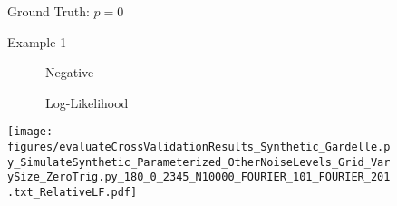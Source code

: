 \begin{figure}
\center

Ground Truth: $p = 0$


\begin{comment}
python3 CounterfactualModel_VIZ.py 0 0 10.0 180 FOURIER_101 FOURIER_201 2345
python3 CounterfactualModel_VIZ.py 0 0 10.0 180 FOURIER_102 FOURIER_202 2345
python3 CounterfactualModel_VIZ.py 0 0 10.0 180 FOURIER_103 FOURIER_203 2345


python3 RunSynthetic_FreePrior_ZeroTrig_OnSim_VIZ.py 0 0 10.0 180 SimulateSynthetic_Parameterized_OtherNoiseLevels_Grid_VarySize_ZeroTrig.py_180_0_2345_N10000_FOURIER_101_FOURIER_201.txt
python3 RunSynthetic_FreePrior_ZeroTrig_OnSim_VIZ.py 0 0 10.0 180 SimulateSynthetic_Parameterized_OtherNoiseLevels_Grid_VarySize_ZeroTrig.py_180_0_2345_N10000_FOURIER_102_FOURIER_202.txt
python3 RunSynthetic_FreePrior_ZeroTrig_OnSim_VIZ.py 0 0 10.0 180 SimulateSynthetic_Parameterized_OtherNoiseLevels_Grid_VarySize_ZeroTrig.py_180_0_2345_N10000_FOURIER_103_FOURIER_203.txt

python3 evaluateCrossValidationResults_Synthetic_Gardelle.py SimulateSynthetic_Parameterized_OtherNoiseLevels_Grid_VarySize_ZeroTrig.py_180_0_2345_N10000_FOURIER_101_FOURIER_201.txt
python3 evaluateCrossValidationResults_Synthetic_Gardelle.py SimulateSynthetic_Parameterized_OtherNoiseLevels_Grid_VarySize_ZeroTrig.py_180_0_2345_N10000_FOURIER_102_FOURIER_202.txt
python3 evaluateCrossValidationResults_Synthetic_Gardelle.py SimulateSynthetic_Parameterized_OtherNoiseLevels_Grid_VarySize_ZeroTrig.py_180_0_2345_N10000_FOURIER_103_FOURIER_203.txt
\end{comment}



Example 1

\begin{minipage}[c]{0.8\linewidth}

\end{minipage}
\begin{minipage}[c]{0.19\linewidth}
\centering

\ \ \ \ \ \ Negative

\ \ \ \ \ \ Log-Likelihood

\texttt{[image: figures/evaluateCrossValidationResults\_Synthetic\_Gardelle.py\_SimulateSynthetic\_Parameterized\_OtherNoiseLevels\_Grid\_VarySize\_ZeroTrig.py\_180\_0\_2345\_N10000\_FOURIER\_101\_FOURIER\_201.txt\_RelativeLF.pdf]}
\end{minipage}


\end{figure}
